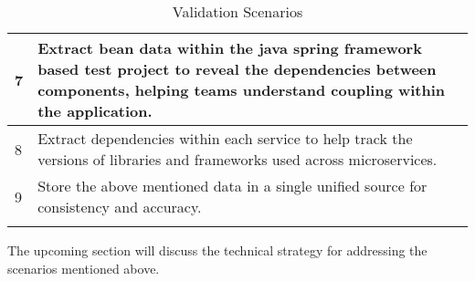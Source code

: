 \begin{longtable}{|p{2cm}|p{12cm}|}
7 & Extract bean data within the java spring framework based test project to reveal the dependencies between components, helping teams understand coupling within the application.\\ \hline

8 & Extract dependencies within each service to help track the versions of libraries and frameworks used across microservices.\\ \hline

9 & Store the above mentioned data in a single unified source for consistency and accuracy.\\ \hline

\caption{Validation Scenarios}	
\label{table_vision_scenarios}
\end{longtable}

The upcoming section will discuss the technical strategy for addressing the scenarios mentioned above.